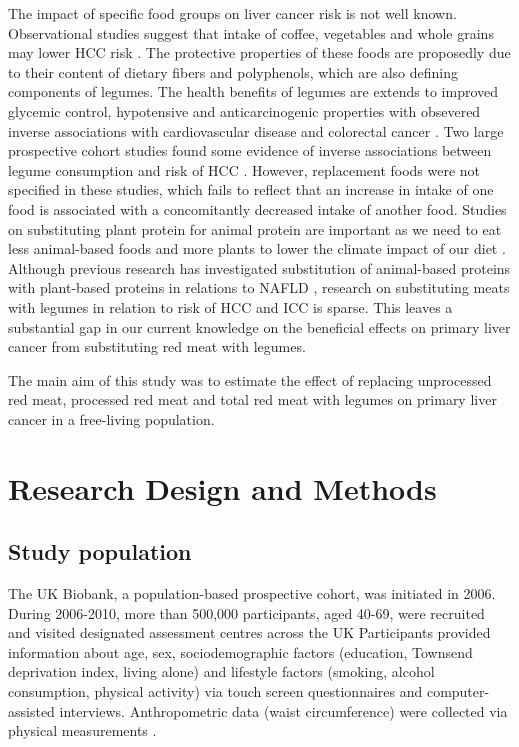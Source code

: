 \documentclass[nutrients,article,submit,moreauthors,pdftex]{Definitions/mdpi}
\begin{document}
The impact of specific food groups on liver cancer risk is not well
known. Observational studies suggest that intake of coffee, vegetables
and whole grains may lower HCC risk
\citep{zhang2013, yang2014, Liu2021, Bhurwal2020}. The protective
properties of these foods are proposedly due to their content of dietary
fibers and polyphenols, which are also defining components of legumes.
The health benefits of legumes are extends to improved glycemic control,
hypotensive and anticarcinogenic properties with obsevered inverse
associations with cardiovascular disease and colorectal cancer
\citep{viguiliouk2019, jin2022}. Two large prospective cohort studies
found some evidence of inverse associations between legume consumption
and risk of HCC \citep{zhang2013, Liu2021}. However, replacement foods
were not specified in these studies, which fails to reflect that an
increase in intake of one food is associated with a concomitantly
decreased intake of another food. Studies on substituting plant protein
for animal protein are important as we need to eat less animal-based
foods and more plants to lower the climate impact of our diet
\citep{RN71}. Although previous research has investigated substitution
of animal-based proteins with plant-based proteins in relations to NAFLD
\citep{Zhang2023}, research on substituting meats with legumes in
relation to risk of HCC and ICC is sparse. This leaves a substantial gap
in our current knowledge on the beneficial effects on primary liver
cancer from substituting red meat with legumes.

The main aim of this study was to estimate the effect of replacing
unprocessed red meat, processed red meat and total red meat with legumes
on primary liver cancer in a free-living population.

\hypertarget{sec2}{%
\section{Research Design and Methods}\label{sec2}}

\hypertarget{subsec1}{%
\subsection{Study population}\label{subsec1}}

The UK Biobank, a population-based prospective cohort, was initiated in
2006. \citep{sudlow2015} During 2006-2010, more than 500,000
participants, aged 40-69, were recruited and visited designated
assessment centres across the UK Participants provided information about
age, sex, sociodemographic factors (education, Townsend deprivation
index, living alone) and lifestyle factors (smoking, alcohol
consumption, physical activity) via touch screen questionnaires and
computer-assisted interviews. Anthropometric data (waist circumference)
were collected via physical measurements \citep{RN113}.
\end{document}
